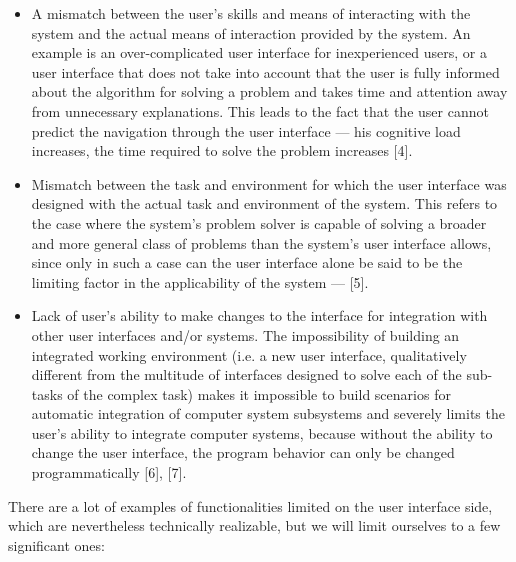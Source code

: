\documentclass[10pt]{article}
\begin{document}
\begin{itemize}
    \item A mismatch between the user’s skills and means of
interacting with the system and the actual means of
interaction provided by the system. An example is
an over-complicated user interface for inexperienced
users, or a user interface that does not take into
account that the user is fully informed about the
algorithm for solving a problem and takes time
and attention away from unnecessary explanations.
This leads to the fact that the user cannot predict
the navigation through the user interface — his
cognitive load increases, the time required to solve
the problem increases [4].

\item Mismatch between the task and environment for
which the user interface was designed with the
actual task and environment of the system. This
refers to the case where the system’s problem solver
is capable of solving a broader and more general
class of problems than the system’s user interface
allows, since only in such a case can the user
interface alone be said to be the limiting factor in
the applicability of the system — [5].

\item Lack of user’s ability to make changes to the interface
for integration with other user interfaces
and/or systems. The impossibility of building an
integrated working environment (i.e. a new user
interface, qualitatively different from the multitude
of interfaces designed to solve each of the sub-tasks
of the complex task) makes it impossible to build
scenarios for automatic integration of computer system
subsystems and severely limits the user’s ability
to integrate computer systems, because without the
ability to change the user interface, the program
behavior can only be changed programmatically [6],
[7].
\end{itemize}

There are a lot of examples of functionalities limited
on the user interface side, which are nevertheless technically
realizable, but we will limit ourselves to a few
significant ones:
\end{document}
